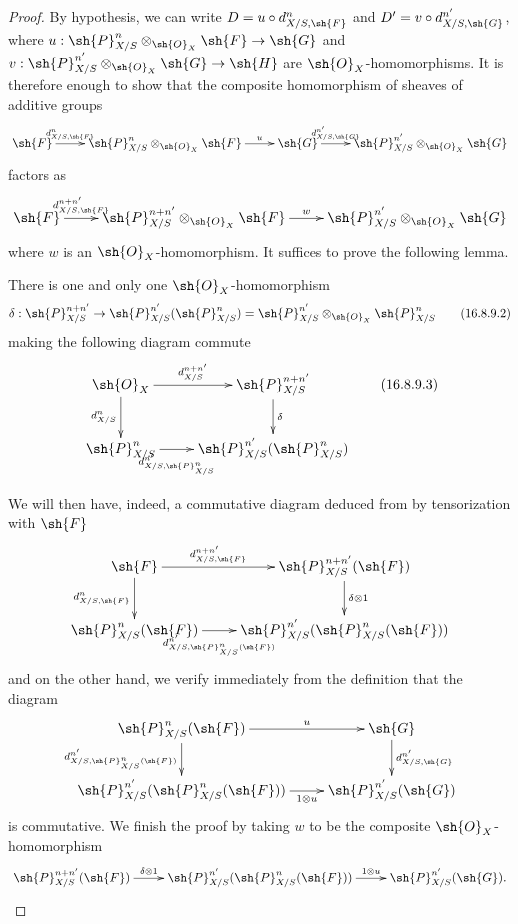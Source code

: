 \begin{proof}
By hypothesis, we can write $D = u \circ d_{X/S, \sh{F}}^n$ and $D' = v \circ d_{X/S, \sh{G}}^{n'}$, where $u: \sh{P}_{X/S}^n \otimes_{\sh{O}_X} \sh{F} \to \sh{G}$ and $v: \sh{P}_{X/S}^{n'} \otimes_{\sh{O}_X} \sh{G} \to \sh{H}$ are $\sh{O}_X$-homomorphisms.
It is therefore enough to show that the composite homomorphism of sheaves of additive groups
\[
  \xymatrix{
    \sh{F} \ar[r]^-{d_{X/S, \sh{F}}^n} & \sh{P}_{X/S}^n \otimes_{\sh{O}_X} \sh{F} \ar[r]^-u & \sh{G} \ar[r]^-{d_{X/S, \sh{G}}^{n'}} & \sh{P}_{X/S}^{n'} \otimes_{\sh{O}_X} \sh{G}
  }
\]
factors as
\[
  \xymatrix{
    \sh{F} \ar[r]^-{d_{X/S, \sh{F}}^{n + n'}} & \sh{P}_{X/S}^{n + n'} \otimes_{\sh{O}_X} \sh{F} \ar[r]^-w &  \sh{P}_{X/S}^{n'} \otimes_{\sh{O}_X} \sh{G}
  }
\]
where $w$ is an $\sh{O}_X$-homomorphism.
It suffices to prove the following lemma.
\begin{lemma}[16.8.9.1]
\label{IV.16.8.9.1}
There is one and only one $\sh{O}_X$-homomorphism
\[
  \label{IV.16.8.9.2}
  \delta: \sh{P}_{X/S}^{n + n'} \to \sh{P}_{X/S}^{n'}(\sh{P}_{X/S}^n) = \sh{P}_{X/S}^{n'} \otimes_{\sh{O}_X} \sh{P}_{X/S}^n 
  \tag{16.8.9.2}
\]
making the following diagram commute
\[
  \label{IV.16.8.9.3}
  \xymatrix{
    \sh{O}_X \ar[r]^-{d_{X/S}^{n + n'}} \ar[d]_-{d_{X/S}^{n}} & \sh{P}_{X/S}^{n + n'} \ar[d]^-\delta \\
    \sh{P}_{X/S}^n \ar[r]_-{d_{X/S, \sh{P}_{X/S}^n}^{n'}} & \sh{P}_{X/S}^{n'} (\sh{P}_{X/S}^n)
  }
  \tag{16.8.9.3}
\]
\end{lemma}

We will then have, indeed, a commutative diagram deduced from  by tensorization with $\sh{F}$
\[
  \xymatrix{
    \sh{F} \ar[r]^-{d_{X/S, \sh{F}}^{n + n'}} \ar[d]_-{d_{X/S, \sh{F}}^{n}} & \sh{P}_{X/S}^{n + n'}(\sh{F}) \ar[d]^-{\delta \otimes 1} \\
    \sh{P}_{X/S}^n(\sh{F}) \ar[r]_-{d_{X/S, \sh{P}_{X/S}^n(\sh{F})}^{n'}} & \sh{P}_{X/S}^{n'}(\sh{P}_{X/S}^n(\sh{F}))
  }
\]
and on the other hand, we verify immediately from the definition  that the diagram
\[
  \xymatrix{
    \sh{P}_{X/S}^n(\sh{F}) \ar[r]^-{u} \ar[d]_-{d_{X/S, \sh{P}_{X/S}^n(\sh{F})}^{n'}} & \sh{G} \ar[d]^-{d_{X/S, \sh{G}}^{n'}} \\
    \sh{P}_{X/S}^{n'}(\sh{P}_{X/S}^n(\sh{F})) \ar[r]_-{1 \otimes u} & \sh{P}_{X/S}^{n'}(\sh{G})
  }
\]
is commutative.
We finish the proof by taking $w$ to be the composite $\sh{O}_X$-homomorphism
\[
  \xymatrix{
    \sh{P}_{X/S}^{n+n'}(\sh{F}) \ar[r]^-{\delta \otimes 1} & \sh{P}_{X/S}^{n'}(\sh{P}_{X/S}^n(\sh{F})) \ar[r]^-{1 \otimes u} & \sh{P}_{X/S}^{n'}(\sh{G}).
  }
\]
\end{proof}

